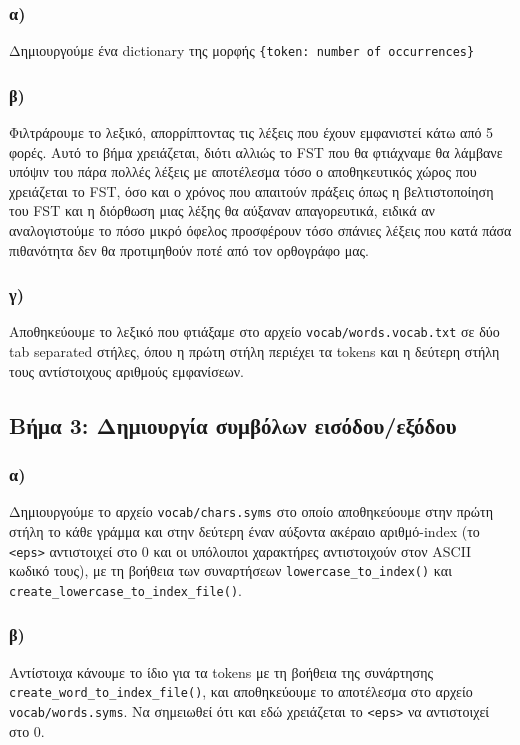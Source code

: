 \documentclass[a4paper, 12pt]{article}
\begin{document}
        \subsubsection*{α)}
        	Δημιουργούμε ένα dictionary της μορφής \verb|{token: number of occurrences}|

        \subsubsection*{β)}
        	Φιλτράρουμε το λεξικό, απορρίπτοντας τις λέξεις που έχουν εμφανιστεί κάτω από 5 φορές. Αυτό το βήμα χρειάζεται, διότι αλλιώς το FST που θα φτιάχναμε θα λάμβανε υπόψιν του πάρα πολλές λέξεις με αποτέλεσμα τόσο ο αποθηκευτικός χώρος που χρειάζεται το FST, όσο και ο χρόνος που απαιτούν πράξεις όπως η βελτιστοποίηση του FST και η διόρθωση μιας λέξης θα αύξαναν απαγορευτικά, ειδικά αν αναλογιστούμε το πόσο μικρό όφελος προσφέρουν τόσο σπάνιες λέξεις που κατά πάσα πιθανότητα δεν θα προτιμηθούν ποτέ από τον ορθογράφο μας.
        	
        \subsubsection*{γ)}
        	Αποθηκεύουμε το λεξικό που φτιάξαμε στο αρχείο \verb|vocab/words.vocab.txt| σε δύο tab separated στήλες, όπου η πρώτη στήλη περιέχει τα tokens και η δεύτερη στήλη τους αντίστοιχους αριθμούς εμφανίσεων.
    
    \subsection*{Βήμα 3: Δημιουργία συμβόλων εισόδου/εξόδου}
        \subsubsection*{α)}
        	Δημιουργούμε το αρχείο \verb|vocab/chars.syms| στο οποίο αποθηκεύουμε στην πρώτη στήλη το κάθε γράμμα και στην δεύτερη έναν αύξοντα ακέραιο αριθμό-index (το \verb|<eps>| αντιστοιχεί στο 0 και οι υπόλοιποι χαρακτήρες αντιστοιχούν στον ASCII κωδικό τους), με τη βοήθεια των συναρτήσεων \verb|lowercase_to_index()| και \verb|create_lowercase_to_index_file()|.
        \subsubsection*{β)} 
        	Αντίστοιχα κάνουμε το ίδιο για τα tokens με τη βοήθεια της συνάρτησης \verb|create_word_to_index_file()|, και αποθηκεύουμε το αποτέλεσμα στο αρχείο \verb|vocab/words.syms|. Να σημειωθεί ότι και εδώ χρειάζεται το \verb|<eps>| να αντιστοιχεί στο 0. 
    
\end{document}
